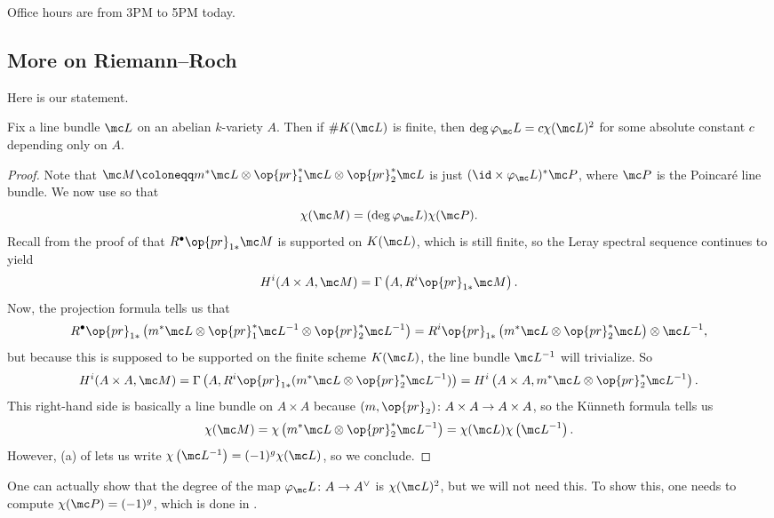 \documentclass[../notes.tex]{subfiles}
\begin{document}
Office hours are from 3PM to 5PM today.

\subsection{More on Riemann--Roch}
Here is our statement.
\begin{proposition} \label{prop:deg-is-euler-char}
	Fix a line bundle $\mc L$ on an abelian $k$-variety $A$. Then if $\#K(\mc L)$ is finite, then $\deg\varphi_\mc L=c\chi(\mc L)^2$ for some absolute constant $c$ depending only on $A$.
\end{proposition}
\begin{proof}
	Note that $\mc M\coloneqq m^*\mc L\otimes\op{pr}_1^*\mc L\otimes\op{pr}_2^*\mc L$ is just $({\id}\times\varphi_\mc L)^*\mc P$, where $\mc P$ is the Poincar\'e line bundle. We now use  so that
	\[\chi(\mc M)=(\deg\varphi_\mc L)\chi(\mc P).\]
	Recall from the proof of  that $R^\bullet\op{pr}_{1*}\mc M$ is supported on $K(\mc L)$, which is still finite, so the Leray spectral sequence continues to yield
	\[H^i(A\times A,\mc M)=\Gamma\left(A,R^i\op{pr}_{1*}\mc M\right).\]
	Now, the projection formula tells us that
	\[R^\bullet\op{pr}_{1*}\left(m^*\mc L\otimes\op{pr}_1^*\mc L^{-1}\otimes\op{pr}_2^*\mc L^{-1}\right)=R^i\op{pr}_{1*}\left(m^*\mc L\otimes\op{pr}_2^*\mc L\right)\otimes\mc L^{-1},\]
	but because this is supposed to be supported on the finite scheme $K(\mc L)$, the line bundle $\mc L^{-1}$ will trivialize. So
	\[H^i(A\times A,\mc M)=\Gamma\left(A,R^i\op{pr}_{1*}(m^*\mc L\otimes\op{pr}_{2}^*\mc L^{-1})\right)=H^i\left(A\times A,m^*\mc L\otimes\op{pr}_2^*\mc L^{-1}\right).\]
	This right-hand side is basically a line bundle on $A\times A$ because $(m,{\op{pr}_2})\colon A\times A\to A\times A$, so the K\"unneth formula tells us
	\[\chi(\mc M)=\chi\left(m^*\mc L\otimes\op{pr}_2^*\mc L^{-1}\right)=\chi(\mc L)\chi\left(\mc L^{-1}\right).\]
	However, (a) of  lets us write $\chi\left(\mc L^{-1}\right)=(-1)^g\chi(\mc L)$, so we conclude.
\end{proof}
\begin{remark}
	One can actually show that the degree of the map $\varphi_\mc L\colon A\to A^\lor$ is $\chi(\mc L)^2$, but we will not need this. To show this, one needs to compute $\chi(\mc P)=(-1)^g$, which is done in \cite[Part~III]{mumford}.
\end{remark}
\end{document}
